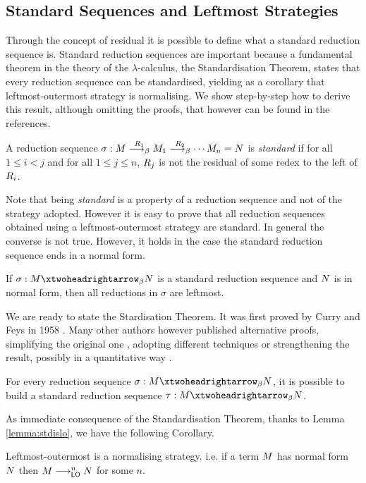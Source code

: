 \begin{THESIS}
	\subsection{Standard Sequences and Leftmost Strategies}
	Through the concept of residual it is possible to define what a standard reduction sequence is. Standard reduction sequences are important because a fundamental theorem in the theory of the $\lambda$-calculus, the Standardisation Theorem, states that every reduction sequence can be standardised, yielding as a corollary that leftmost-outermost strategy is normalising. We show step-by-step how to derive this result, although omitting the proofs, that however can be found in the references.  
	\begin{definition}
		A reduction sequence $\sigma:M\overset{R_1}{\longrightarrow_\beta}M_1\overset{R_2}{\longrightarrow_\beta}\cdots M_n=N$ is \emph{standard} if for all $1\leq i<j$ and for all $1\leq j\leq n$, $R_j$ is not the residual of some redex to the left of $R_i$.
	\end{definition}
	\begin{remark}
		Note that being \emph{standard} is a property of a reduction sequence and not of the strategy adopted. However it is easy to prove that all reduction sequences obtained using a leftmost-outermost strategy are standard. In general the converse is not true. However, it holds in the case the standard reduction sequence ends in a normal form.
	\end{remark}
	\begin{lemma}\label{lemma:stdislo}
		If $\sigma:\termone\redbetaclo\termtwo$ is a standard reduction sequence and $N$ is in normal form, then all reductions in $\sigma$ are leftmost.
	\end{lemma}
	We are ready to state the Stardisation Theorem. It was first proved by Curry and Feys in 1958 \cite{curry_combinatory_1958}. Many other authors however published alternative proofs, simplifying the original one \cite{mitschke_standardization_1979}, adopting different techniques \cite{klop_combinatory_1980} or strengthening the result, possibly in a quantitative way \cite{xi_upper_1999}.
	\begin{theorem}[Standardisation]
		For every reduction sequence $\sigma:\termone\redbetaclo\termtwo$, it is possible to build a standard reduction sequence $\tau:\termone\redbetaclo\termtwo$.
	\end{theorem}
	As immediate consequence of the Standardisation Theorem, thanks to Lemma \ref{lemma:stdislo}, we have the following Corollary.
	\begin{corollary}[Normalisation]
		Leftmost-outermost is a normalising strategy. i.e. if a term $M$ has normal form $N$ then $M\longrightarrow_{\textsf{LO}}^nN$ for some $n$.
	\end{corollary}
\end{THESIS}
